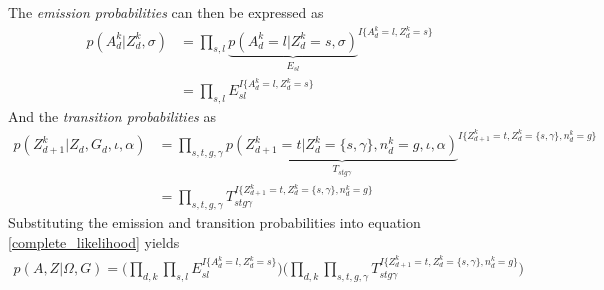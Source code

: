 The \textit{emission probabilities} can then be expressed as
\begin{align}
  p(A_d^k|Z_d^k, \sigma) & = \prod_{s,l} {\underbrace{p(A_d^k=l|Z_d^k=s, \sigma)}_\text{$E_{sl}$}} ^{I\{A_d^k=l, Z_d^k=s\}} \nonumber \\
  & = \prod_{s,l}  E_{sl}^{I\{A_d^k=l, Z_d^k=s\}}
\end{align}
And the \textit{transition probabilities} as
\begin{align}
  p(Z_{d+1}^k|Z_d, G_d, \iota, \alpha) & = \prod_{s,t,g,\gamma}
  {\underbrace{p(Z_{d+1}^k = t|Z_d^k = \{s,\gamma\}, n_d^k = g, \iota, \alpha)}_\text{$T_{stg\gamma}$}} ^{I\{Z_{d+1}^k = t, Z_d^k = \{s,\gamma\}, n_d^k = g\}} \nonumber \\
  & = \prod_{s,t,g,\gamma} T_{stg\gamma}^{I\{Z_{d+1}^k = t, Z_d^k = \{s,\gamma\}, n_d^k = g\}}
\end{align}
Substituting the emission and transition probabilities into equation \eqref{complete_likelihood} yields
\begin{align}
  p(A,Z|\Omega, G) = \bigg( \prod_{d,k} \prod_{s,l} E_{sl}^{I\{A_d^k=l, Z_d^k=s\}} \bigg) \bigg( \prod_{d,k} \prod_{s,t,g,\gamma} T_{stg\gamma}^{I\{Z_{d+1}^k = t, Z_d^k = \{s,\gamma\}, n_d^k = g\}} \bigg)
\end{align}

